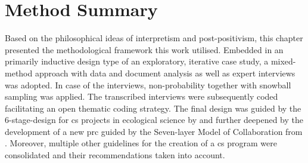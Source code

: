 
\section{Method Summary}

Based on the philosophical ideas of interpretism and post-positivism, this chapter presented the methodological framework this work utilised. Embedded in an primarily inductive design type of an exploratory, iterative case study, a mixed-method approach with data and document analysis as well as expert interviews was adopted. In case of the interviews, non-probability together with snowball sampling was applied. The transcribed interviews were subsequently coded facilitating an open thematic coding strategy. The final design was guided by the 6-stage-design for \acrlong{cs} projects in ecological science by \autocite{fraislCitizenScienceEnvironmental2022} and further deepened by the development of a new \acrlong{prc} guided by the Seven-layer Model of Collaboration from \autocite{briggsSevenLayerModelCollaboration}. Moreover, multiple other guidelines for the creation of a \acrshort{cs} program were consolidated and their recommendations taken into account.\newline




